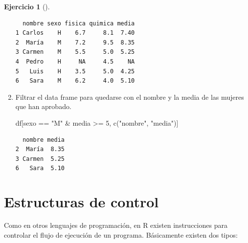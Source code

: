 \documentclass[
  a4paper,
]{scrreport}
\newenvironment{Shaded}{\begin{snugshade}}{\end{snugshade}}
\newcommand{\DecValTok}[1]{\textcolor[rgb]{0.68,0.00,0.00}{#1}}
\newcommand{\FunctionTok}[1]{\textcolor[rgb]{0.28,0.35,0.67}{#1}}
\newcommand{\NormalTok}[1]{\textcolor[rgb]{0.00,0.23,0.31}{#1}}
\newcommand{\SpecialCharTok}[1]{\textcolor[rgb]{0.37,0.37,0.37}{#1}}
\newcommand{\StringTok}[1]{\textcolor[rgb]{0.13,0.47,0.30}{#1}}
\theoremstyle{definition}
\newtheorem{exercise}{Ejercicio}[chapter]
\theoremstyle{definition}
\theoremstyle{remark}
\begin{document}
\begin{exercise}[]
\begin{enumerate}
\begin{tcolorbox}
\begin{verbatim}
  nombre sexo fisica quimica media
1 Carlos    H    6.7     8.1  7.40
2  María    M    7.2     9.5  8.35
3 Carmen    M    5.5     5.0  5.25
4  Pedro    H     NA     4.5    NA
5   Luis    H    3.5     5.0  4.25
6   Sara    M    6.2     4.0  5.10
\end{verbatim}

  \end{tcolorbox}
\item
  Filtrar el data frame para quedarse con el nombre y la media de las
  mujeres que han aprobado.

  \begin{tcolorbox}[enhanced jigsaw, title=\textcolor{quarto-callout-note-color}{\faInfo}\hspace{0.5em}{Solución}, titlerule=0mm, toprule=.15mm, colbacktitle=quarto-callout-note-color!10!white, arc=.35mm, colframe=quarto-callout-note-color-frame, opacitybacktitle=0.6, coltitle=black, left=2mm, colback=white, opacityback=0, breakable, bottomrule=.15mm, toptitle=1mm, leftrule=.75mm, bottomtitle=1mm, rightrule=.15mm]

\begin{Shaded}
\begin{Highlighting}[]
\NormalTok{df[sexo }\SpecialCharTok{==} \StringTok{"M"} \SpecialCharTok{\&}\NormalTok{ media }\SpecialCharTok{\textgreater{}=} \DecValTok{5}\NormalTok{, }\FunctionTok{c}\NormalTok{(}\StringTok{"nombre"}\NormalTok{, }\StringTok{"media"}\NormalTok{)]}
\end{Highlighting}
\end{Shaded}

\begin{verbatim}
  nombre media
2  María  8.35
3 Carmen  5.25
6   Sara  5.10
\end{verbatim}

  \end{tcolorbox}
\end{enumerate}

\end{exercise}


\chapter{Estructuras de control}\label{estructuras-de-control}

Como en otros lenguajes de programación, en R existen instrucciones para
controlar el flujo de ejecución de un programa. Básicamente existen dos
tipos:
\end{document}
